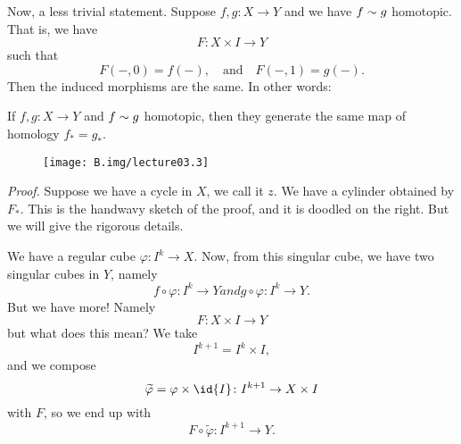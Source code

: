 Now, a less trivial statement. Suppose $f,g\colon X\to Y$ and we
have $f\sim g$ homotopic. That is, we have
\begin{equation}
F\colon X\times I\to Y
\end{equation}
such that
\begin{equation}
F(-,0)=f(-),\quad\mbox{and}\quad F(-,1)=g(-).
\end{equation}
Then the induced morphisms are the same. In other words:
\begin{thm}
If $f,g\colon X\to Y$ and $f\sim g$ homotopic, then they
generate the same map of homology $f_{*}=g_{*}$.
\end{thm}

\begin{wrapfigure}{r}{11pc}
  \vspace{-30pt}
  \centering
  \texttt{[image: B.img/lecture03.3]}
  \vspace{-24pt}
\end{wrapfigure}
\noindent\emph{Proof.\enspace}\ignorespaces %
Suppose we have a cycle in $X$, we call it $z$. We have a
cylinder obtained by $F_{*}$. This is the handwavy sketch of the
proof, and it is doodled on the right. But we will give the
rigorous details.

We have a regular cube $\varphi\colon I^{k}\to X$. Now, from this
singular cube, we have two singular cubes in $Y$, namely
\begin{subequations}
\begin{equation}
f\circ\varphi\colon I^k\to Y
\end{equation}
and
\begin{equation}
g\circ\varphi\colon I^k\to Y.
\end{equation}
\end{subequations}
But we have more! Namely
\begin{equation}
F\colon X\times I\to Y
\end{equation}
but what does this mean? We take
\begin{equation}
I^{k+1}=I^{k}\times I,
\end{equation}
and we compose
\begin{equation}
\widetilde{\varphi}=\varphi\times\id{I}\colon I^{k+1}\to X\times I
\end{equation}
with $F$, so we end up with
\begin{equation}
F\circ\widetilde{\varphi}\colon I^{k+1}\to Y.
\end{equation}

